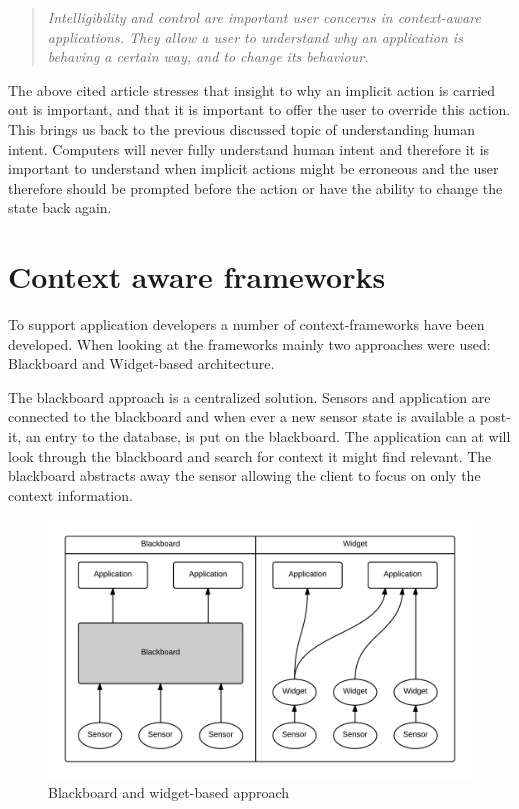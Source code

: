 \documentclass[../report.tex]{subfiles}
\begin{document}
\blockquote{\textit{Intelligibility and control are important user concerns in context-aware applications. They allow a user to understand why an application is behaving a certain way, and to change its behaviour.}} \cite{Dey and Newberger (2009)}

The above cited article stresses that insight to why an implicit action is carried out is important, and that it is important to offer the user to override this action. This brings us back to the previous discussed topic of understanding human intent. Computers will never fully understand human intent and therefore it is important to understand when implicit actions might be erroneous and the user therefore should be prompted before the action or have the ability to change the state back again.

\section{Context aware frameworks}
To support application developers a number of context-frameworks have been developed. When looking at the frameworks mainly two approaches were used: Blackboard and Widget-based architecture.

The blackboard approach is a centralized solution. Sensors and application are connected to the blackboard and when ever a new sensor state is available a post-it, an entry to the database, is put on the blackboard. The application can at will look through the blackboard and search for context it might find relevant. The blackboard abstracts away the sensor allowing the client to focus on only the context information. 

\begin{figure}
\centering
\includegraphics[width=\linewidth]{blackboard-widget.png}
\caption{Blackboard and widget-based approach}
\label{fig:blackboard-widget}
\end{figure}
\end{document}
